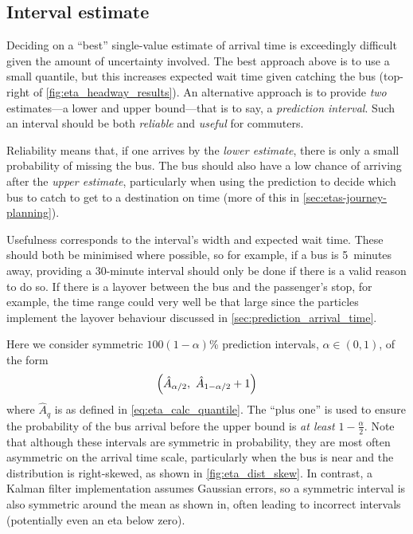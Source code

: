 \subsection{Interval estimate}
\label{sec:etas-interval}


Deciding on a ``best'' single-value estimate of arrival time is exceedingly difficult given the amount of uncertainty involved. The best approach above is to use a small quantile, but this increases expected wait time given catching the bus (top-right of \cref{fig:eta_headway_results}). An alternative approach is to provide \emph{two} estimates---a lower and upper bound---that is to say, a \emph{prediction interval}. Such an interval should be both \emph{reliable} and \emph{useful} for commuters.

Reliability means that, if one arrives by the \emph{lower estimate}, there is only a small probability of missing the bus. The bus should also have a low chance of arriving after the \emph{upper estimate}, particularly when using the prediction to decide which bus to catch to get to a destination on time (more of this in \cref{sec:etas-journey-planning}).

Usefulness corresponds to the interval's width and expected wait time. These should both be minimised where possible, so for example, if a bus is 5~minutes away, providing a 30-minute interval should only be done if there is a valid reason to do so. If there is a layover between the bus and the passenger's stop, for example, the time range could very well be that large since the particles implement the layover behaviour discussed in \cref{sec:prediction_arrival_time}.







Here we consider symmetric $100(1-\alpha)$\% prediction intervals, $\alpha\in (0,1)$, of the form
\begin{equation}
\left(\hat\Teta_{\alpha/2},\ \hat\Teta_{1-\alpha/2}+1\right)
\end{equation}
where $\hat A_q$ is as defined in \cref{eq:eta_calc_quantile}. The ``plus one'' is used to ensure the probability of the bus arrival before the upper bound is \emph{at least} $1-\frac{\alpha}{2}$. Note that although these intervals are symmetric in probability, they are most often asymmetric on the arrival time scale, particularly when the bus is near and the distribution is right-skewed, as shown in \cref{fig:eta_dist_skew}. In contrast, a Kalman filter implementation assumes Gaussian errors, so a symmetric interval is also symmetric around the mean as shown in, often leading to incorrect intervals (potentially even an \gls{eta} below zero).



